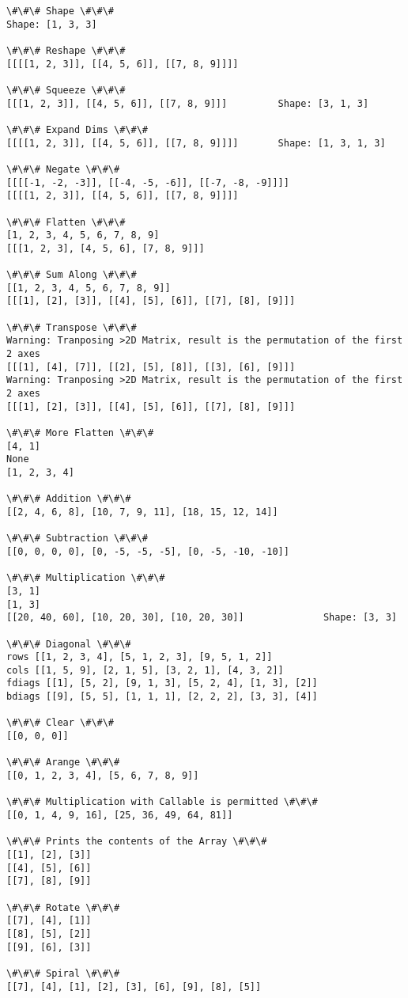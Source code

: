 \documentclass[9pt]{article}
\makeatletter
\newcommand{\boxspacing}{\kern\kvtcb@left@rule\kern\kvtcb@boxsep}
\newcommand{\prompt}[4]{
        {\ttfamily\llap{{\color{#2}[#3]:\hspace{3pt}#4}}\vspace{-\baselineskip}}
    }
\makeatother
\begin{document}
    \begin{Verbatim}[commandchars=\\\{\}]
\#\#\# Shape \#\#\#
Shape: [1, 3, 3]

\#\#\# Reshape \#\#\#
[[[[1, 2, 3]], [[4, 5, 6]], [[7, 8, 9]]]]

\#\#\# Squeeze \#\#\#
[[[1, 2, 3]], [[4, 5, 6]], [[7, 8, 9]]]         Shape: [3, 1, 3]

\#\#\# Expand Dims \#\#\#
[[[[1, 2, 3]], [[4, 5, 6]], [[7, 8, 9]]]]       Shape: [1, 3, 1, 3]

\#\#\# Negate \#\#\#
[[[[-1, -2, -3]], [[-4, -5, -6]], [[-7, -8, -9]]]]
[[[[1, 2, 3]], [[4, 5, 6]], [[7, 8, 9]]]]

\#\#\# Flatten \#\#\#
[1, 2, 3, 4, 5, 6, 7, 8, 9]
[[[1, 2, 3], [4, 5, 6], [7, 8, 9]]]

\#\#\# Sum Along \#\#\#
[[1, 2, 3, 4, 5, 6, 7, 8, 9]]
[[[1], [2], [3]], [[4], [5], [6]], [[7], [8], [9]]]

\#\#\# Transpose \#\#\#
Warning: Tranposing >2D Matrix, result is the permutation of the first 2 axes
[[[1], [4], [7]], [[2], [5], [8]], [[3], [6], [9]]]
Warning: Tranposing >2D Matrix, result is the permutation of the first 2 axes
[[[1], [2], [3]], [[4], [5], [6]], [[7], [8], [9]]]

\#\#\# More Flatten \#\#\#
[4, 1]
None
[1, 2, 3, 4]

\#\#\# Addition \#\#\#
[[2, 4, 6, 8], [10, 7, 9, 11], [18, 15, 12, 14]]

\#\#\# Subtraction \#\#\#
[[0, 0, 0, 0], [0, -5, -5, -5], [0, -5, -10, -10]]

\#\#\# Multiplication \#\#\#
[3, 1]
[1, 3]
[[20, 40, 60], [10, 20, 30], [10, 20, 30]]              Shape: [3, 3]

\#\#\# Diagonal \#\#\#
rows [[1, 2, 3, 4], [5, 1, 2, 3], [9, 5, 1, 2]]
cols [[1, 5, 9], [2, 1, 5], [3, 2, 1], [4, 3, 2]]
fdiags [[1], [5, 2], [9, 1, 3], [5, 2, 4], [1, 3], [2]]
bdiags [[9], [5, 5], [1, 1, 1], [2, 2, 2], [3, 3], [4]]

\#\#\# Clear \#\#\#
[[0, 0, 0]]

\#\#\# Arange \#\#\#
[[0, 1, 2, 3, 4], [5, 6, 7, 8, 9]]

\#\#\# Multiplication with Callable is permitted \#\#\#
[[0, 1, 4, 9, 16], [25, 36, 49, 64, 81]]

\#\#\# Prints the contents of the Array \#\#\#
[[1], [2], [3]]
[[4], [5], [6]]
[[7], [8], [9]]

\#\#\# Rotate \#\#\#
[[7], [4], [1]]
[[8], [5], [2]]
[[9], [6], [3]]

\#\#\# Spiral \#\#\#
[[7], [4], [1], [2], [3], [6], [9], [8], [5]]
    \end{Verbatim}

    \begin{tcolorbox}[breakable, size=fbox, boxrule=1pt, pad at break*=1mm,colback=cellbackground, colframe=cellborder]
\prompt{In}{incolor}{ }{\boxspacing}
\begin{Verbatim}[commandchars=\\\{\}]

\end{Verbatim}
\end{tcolorbox}


    
    
    
\end{document}
